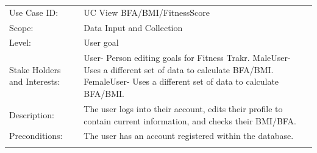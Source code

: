 \documentclass[10pt]{article}
\begin{document}
\begin{longtable}[]{@{}ll@{}}
\toprule
\begin{minipage}[t]{0.47\columnwidth}\raggedright\strut
Use Case ID:\strut
\end{minipage} & \begin{minipage}[t]{0.47\columnwidth}\raggedright\strut
UC View BFA/BMI/FitnessScore\strut
\end{minipage}\tabularnewline
\begin{minipage}[t]{0.47\columnwidth}\raggedright\strut
Scope:\strut
\end{minipage} & \begin{minipage}[t]{0.47\columnwidth}\raggedright\strut
Data Input and Collection\strut
\end{minipage}\tabularnewline
\begin{minipage}[t]{0.47\columnwidth}\raggedright\strut
Level:\strut
\end{minipage} & \begin{minipage}[t]{0.47\columnwidth}\raggedright\strut
User goal\strut
\end{minipage}\tabularnewline
\begin{minipage}[t]{0.47\columnwidth}\raggedright\strut
Stake Holders and Interests:\strut
\end{minipage} & \begin{minipage}[t]{0.47\columnwidth}\raggedright\strut
User- Person editing goals for Fitness Trakr.
MaleUser- Uses a different set of data to calculate BFA/BMI.
FemaleUser- Uses a different set of data to calculate BFA/BMI.
\strut
\end{minipage}\tabularnewline
\begin{minipage}[t]{0.47\columnwidth}\raggedright\strut
Description:\strut
\end{minipage} & \begin{minipage}[t]{0.47\columnwidth}\raggedright\strut
The user logs into their account, edits their profile to contain current information, and checks their BMI/BFA.\strut
\end{minipage}\tabularnewline
\begin{minipage}[t]{0.47\columnwidth}\raggedright\strut
Preconditions:\strut
\end{minipage} & \begin{minipage}[t]{0.47\columnwidth}\raggedright\strut
The user has an account registered within the database.\strut
\end{minipage}\tabularnewline
\begin{minipage}[t]{0.47\columnwidth}\raggedright\strut

\end{minipage}
\end{longtable}
\end{document}
